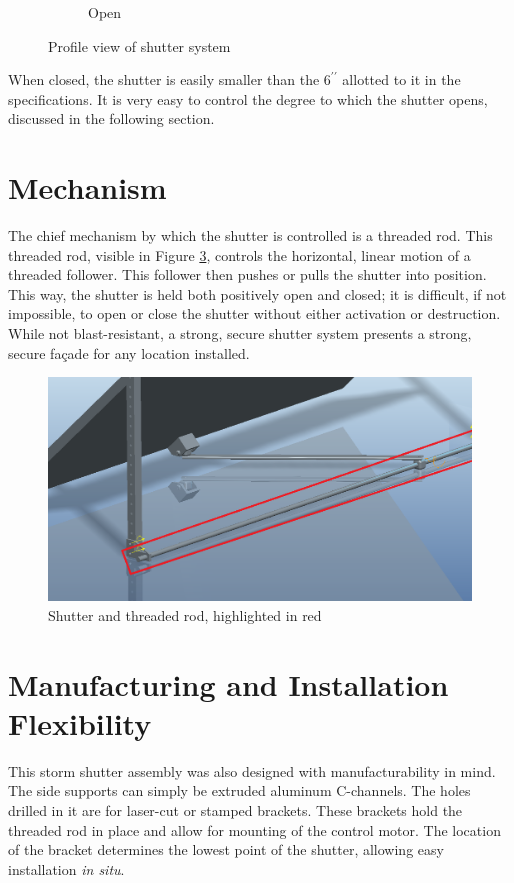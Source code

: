 \documentclass[12pt,letterpaper]{report}
\newcommand{\inchsign}{^{\prime\prime}} %
\begin{document}
\begin{figure}[H]
\begin{subfigure}{.45\textwidth}
				\caption{Open}
				\label{fig:ShutterProfileOpen}
			\end{subfigure}
			\caption{Profile view of shutter system}
		\end{figure}
		
		When closed, the shutter is easily smaller than the $6\inchsign$ allotted to it in the specifications.  It is very easy to control the degree to which the shutter opens, discussed in the following section.
		
		\section{Mechanism}
		The chief mechanism by which the shutter is controlled is a threaded rod.  This threaded rod, visible in Figure \ref{fig:ShutterHighlihgtThreadedRod}, controls the horizontal, linear motion of a threaded follower.  This follower then pushes or pulls the shutter into position.  This way, the shutter is held both positively open and closed; it is difficult, if not impossible, to open or close the shutter without either activation or destruction.  While not blast-resistant, a strong, secure shutter system presents a strong, secure fa\c{c}ade for any location installed.
		
		\begin{figure}[h]
			\centering
			\includegraphics[width=.5\textwidth]{ShutterCloseUpHighlight}
			\caption{Shutter and threaded rod, highlighted in red}
			\label{fig:ShutterHighlihgtThreadedRod}
		\end{figure}
		
		\section{Manufacturing and Installation Flexibility}
		This storm shutter assembly was also designed with manufacturability in mind.  The side supports can simply be extruded aluminum C-channels.  The holes drilled in it are for laser-cut or stamped brackets.  These brackets hold the threaded rod in place and allow for mounting of the control motor.  The location of the bracket determines the lowest point of the shutter, allowing easy installation \textit{in situ}.
		
\end{document}
